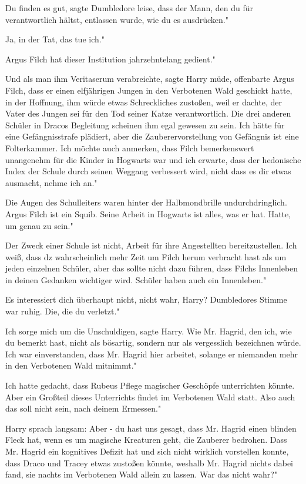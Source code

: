 \glqq{}Du finden es gut\grqq{}, sagte Dumbledore leise, \glqq{}dass der Mann, den
du für verantwortlich hältst, entlassen wurde, wie du es ausdrücken."

\glqq{}Ja, in der Tat, das tue ich."

\glqq{}Argus Filch hat dieser Institution jahrzehntelang gedient."

\glqq{}Und als man ihm Veritaserum verabreichte\grqq{}, sagte Harry müde, \glqq
offenbarte Argus Filch, dass er einen elfjährigen Jungen in den Verbotenen Wald
geschickt hatte, in der Hoffnung, ihm würde etwas Schreckliches zustoßen, weil
er dachte, der Vater des Jungen sei für den Tod seiner Katze verantwortlich. Die
drei anderen Schüler in Dracos Begleitung scheinen ihm egal gewesen zu sein. Ich
hätte für eine Gefängnisstrafe plädiert, aber die Zauberervorstellung von
Gefängnis ist eine Folterkammer. Ich möchte auch anmerken, dass Filch
bemerkenswert unangenehm für die Kinder in Hogwarts war und ich erwarte, dass
der hedonische Index der Schule durch seinen Weggang verbessert wird, nicht dass
es dir etwas ausmacht, nehme ich an."

Die Augen des Schulleiters waren hinter der Halbmondbrille undurchdringlich.
\glqq{}Argus Filch ist ein Squib. Seine Arbeit in Hogwarts ist alles, was er hat.
Hatte, um genau zu sein."

\glqq{}Der Zweck einer Schule ist nicht, Arbeit für ihre Angestellten
bereitzustellen. Ich weiß, dass dz wahrscheinlich mehr Zeit um Filch herum
verbracht hast als um jeden einzelnen Schüler, aber das sollte nicht dazu
führen, dass Filchs Innenleben in deinen Gedanken wichtiger wird. Schüler haben
auch ein Innenleben."

\glqq{}Es interessiert dich überhaupt nicht, nicht wahr, Harry?\grqq{}
Dumbledores Stimme war ruhig. \glqq{}Die, die du verletzt."

\glqq{}Ich sorge mich um die Unschuldigen\grqq{}, sagte Harry. \glqq{}Wie Mr.
Hagrid, den ich, wie du bemerkt hast, nicht als bösartig, sondern nur als
vergesslich bezeichnen würde. Ich war einverstanden, dass Mr. Hagrid hier
arbeitet, solange er niemanden mehr in den Verbotenen Wald mitnimmt."

\glqq{}Ich hatte gedacht, dass Rubeus Pflege magischer Geschöpfe unterrichten
könnte. Aber ein Großteil dieses Unterrichts findet im Verbotenen Wald statt.
Also auch das soll nicht sein, nach deinem Ermessen."

Harry sprach langsam: \glqq{}Aber - du hast uns gesagt, dass Mr. Hagrid einen
blinden Fleck hat, wenn es um magische Kreaturen geht, die Zauberer bedrohen.
Dass Mr. Hagrid ein kognitives Defizit hat und sich nicht wirklich vorstellen
konnte, dass Draco und Tracey etwas zustoßen könnte, weshalb Mr. Hagrid nichts
dabei fand, sie nachts im Verbotenen Wald allein zu lassen. War das nicht wahr?"

